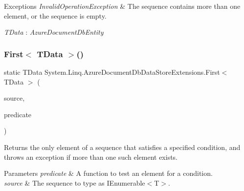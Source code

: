 \begin{DoxyExceptions}{Exceptions}
{\em Invalid\+Operation\+Exception} & The sequence contains more than one element, or the sequence is empty.\\
\hline
\end{DoxyExceptions}
\begin{Desc}
\item[Type Constraints]\begin{description}
\item[{\em T\+Data} : {\em Azure\+Document\+Db\+Entity}]\end{description}
\end{Desc}
\mbox{\label{classSystem_1_1Linq_1_1AzureDocumentDbDataStoreExtensions_aa9bf7da64ecd097ff4270abc3592b56e_aa9bf7da64ecd097ff4270abc3592b56e}} 
\subsubsection{\texorpdfstring{First$<$ T\+Data $>$()}{First< TData >()}\hspace{0.1cm}{\footnotesize\ttfamily [2/2]}}
{\footnotesize\ttfamily static T\+Data System.\+Linq.\+Azure\+Document\+Db\+Data\+Store\+Extensions.\+First$<$ T\+Data $>$ (\begin{DoxyParamCaption}\item[{this \hyperlink{classCqrs_1_1Azure_1_1DocumentDb_1_1DataStores_1_1AzureDocumentDbDataStore}{Azure\+Document\+Db\+Data\+Store}$<$ T\+Data $>$}]{source,  }\item[{Func$<$ T\+Data, bool $>$}]{predicate }\end{DoxyParamCaption})\hspace{0.3cm}{\ttfamily [static]}}



Returns the only element of a sequence that satisfies a specified condition, and throws an exception if more than one such element exists. 


\begin{DoxyParams}{Parameters}
{\em predicate} & A function to test an element for a condition.\\
\hline
{\em source} & The sequence to type as I\+Enumerable$<$\+T$>$.\\
\hline
\end{DoxyParams}

